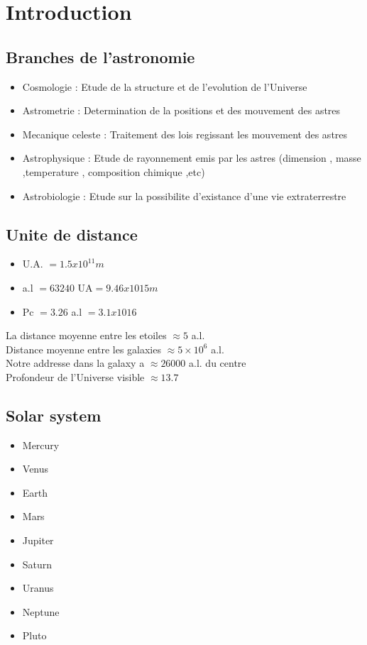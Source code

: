 \documentclass[12pt]{book}
\begin{document}
    \chapter{Introduction}    
        \section{Branches de l'astronomie}
            \begin{itemize}
                \item Cosmologie : Etude de la structure et de l'evolution de l'Universe
                \item Astrometrie : Determination de la positions et des mouvement des astres 
                \item Mecanique celeste : Traitement des lois regissant les mouvement des astres 
                \item Astrophysique : Etude de rayonnement emis par les astres (dimension , masse ,temperature , composition chimique ,etc)
                \item Astrobiologie : Etude sur la possibilite d'existance d'une vie extraterrestre
            \end{itemize}
        \section{Unite de distance}
            \begin{itemize}
                \item U.A. $= 1.5x10^11 m$
                \item a.l $= 63240 $ UA$ = 9.46x1015 m$
                \item Pc $= 3.26 $ a.l $= 3.1x1016 $
            \end{itemize}
            La distance moyenne entre les etoiles $ \approx 5 $ a.l. \\
            Distance moyenne entre les galaxies $\approx 5 \times 10^6$ a.l. \\
            Notre addresse dans la galaxy a $\approx 26000$ a.l. du centre \\
            Profondeur de l'Universe visible $\approx 13.7 $ 
        \section{Solar system}
            \begin{itemize}
                \item Mercury
                \item Venus
                \item Earth
                \item Mars
                \item Jupiter
                \item Saturn
                \item Uranus
                \item Neptune
                \item Pluto
            \end{itemize}
\end{document}
